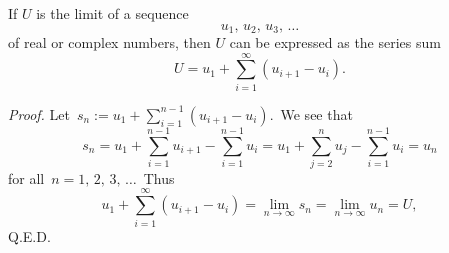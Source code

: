\documentclass[12pt]{article}
\theoremstyle{definition}
\begin{document}
If $U$ is the limit of a sequence
        $$u_1,\,u_2,\,u_3,\,\ldots$$
of real or complex numbers, then $U$ can be expressed as the series sum
     $$U = u_1+\sum_{i=1}^\infty(u_{i+1}-u_i).$$

{\em Proof.}  Let\, $\displaystyle s_n := u_1+\sum_{i=1}^{n-1}(u_{i+1}-u_i)$.\, We see that
$$s_n = u_1+\sum_{i=1}^{n-1}u_{i+1}-\sum_{i=1}^{n-1}u_i = u_1+\sum_{j=2}^nu_j-\sum_{i=1}^{n-1}u_i = u_n$$
for all\, $n = 1,\,2,\,3,\,\ldots$\, Thus
$$u_1+\sum_{i=1}^\infty(u_{i+1}-u_i) = \lim_{n\to\infty}s_n = \lim_{n\to\infty}u_n = U,$$
Q.E.D.
\end{document}
